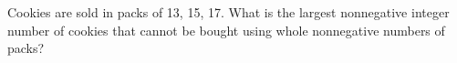 Cookies are sold in packs of 13, 15, 17. What is the largest nonnegative integer number of cookies that cannot be bought using whole nonnegative numbers of packs?
